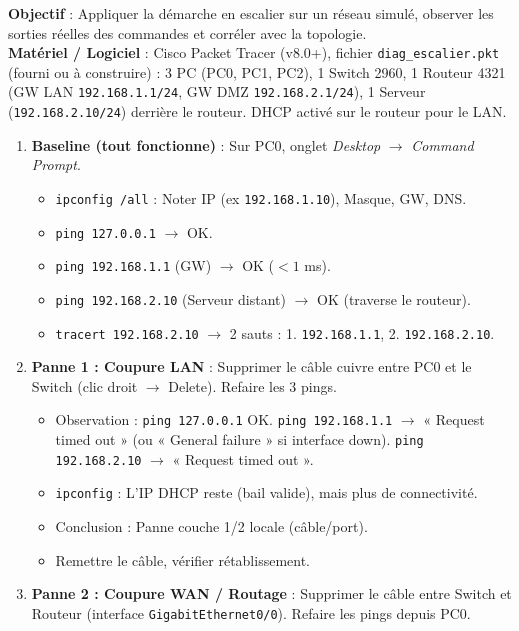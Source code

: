 \documentclass[11pt]{article}
\begin{document}
\begin{experience}
\textbf{Objectif} : Appliquer la démarche en escalier sur un réseau simulé, observer les sorties réelles des commandes et corréler avec la topologie. \\
\textbf{Matériel / Logiciel} : Cisco Packet Tracer (v8.0+), fichier \texttt{diag\_escalier.pkt} (fourni ou à construire) : 3 PC (PC0, PC1, PC2), 1 Switch 2960, 1 Routeur 4321 (GW LAN \texttt{192.168.1.1/24}, GW DMZ \texttt{192.168.2.1/24}), 1 Serveur (\texttt{192.168.2.10/24}) derrière le routeur. DHCP activé sur le routeur pour le LAN.
\begin{enumerate}
\item \textbf{Baseline (tout fonctionne)} : Sur PC0, onglet \emph{Desktop} $\rightarrow$ \emph{Command Prompt}.
      \begin{itemize}
      \item \texttt{ipconfig /all} : Noter IP (ex \texttt{192.168.1.10}), Masque, GW, DNS.
      \item \texttt{ping 127.0.0.1} $\rightarrow$ OK.
      \item \texttt{ping 192.168.1.1} (GW) $\rightarrow$ OK ($<1$ ms).
      \item \texttt{ping 192.168.2.10} (Serveur distant) $\rightarrow$ OK (traverse le routeur).
      \item \texttt{tracert 192.168.2.10} $\rightarrow$ 2 sauts : 1. \texttt{192.168.1.1}, 2. \texttt{192.168.2.10}.
      \end{itemize}
\item \textbf{Panne 1 : Coupure LAN} : Supprimer le câble cuivre entre PC0 et le Switch (clic droit $\rightarrow$ Delete). Refaire les 3 pings.
      \begin{itemize}
      \item Observation : \texttt{ping 127.0.0.1} OK. \texttt{ping 192.168.1.1} $\rightarrow$ « Request timed out » (ou « General failure » si interface down). \texttt{ping 192.168.2.10} $\rightarrow$ « Request timed out ».
      \item \texttt{ipconfig} : L'IP DHCP reste (bail valide), mais plus de connectivité.
      \item Conclusion : Panne couche 1/2 locale (câble/port).
      \item Remettre le câble, vérifier rétablissement.
      \end{itemize}
\item \textbf{Panne 2 : Coupure WAN / Routage} : Supprimer le câble entre Switch et Routeur (interface \texttt{GigabitEthernet0/0}). Refaire les pings depuis PC0.

\end{enumerate}
\end{experience}
\end{document}
